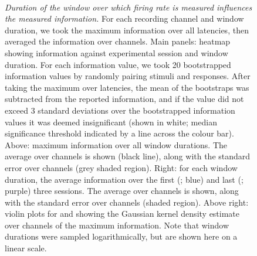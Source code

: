 \begin{figure}[htbp]%
    \centering
    \hspace*{\fill}
    \hspace*{\fill}\hspace{.2cm}\hspace*{\fill}
    \hspace*{\fill}
    \\
    \hspace*{\fill}
    \hspace*{\fill}\hspace{.2cm}\hspace*{\fill}
    \hspace*{\fill}
    \caption{\textit{Duration of the window over which firing rate is measured influences the measured information.}
For each recording channel and window duration, we took the maximum information over all latencies, then averaged the information over channels.
Main panels: heatmap showing information against experimental session and window duration.
For each information value, we took \num{20} bootstrapped information values by randomly pairing stimuli and responses.
After taking the maximum over latencies, the mean of the bootstraps was subtracted from the reported information, and if the value did not exceed \num{3} standard deviations over the bootstrapped information values it was deemed insignificant (shown in white; median significance threshold indicated by a line across the colour bar).
Above: maximum information over all window durations.
The average over channels is shown (black line), along with the standard error over channels (grey shaded region).
Right: for each window duration, the average information over the first (; blue) and last (; purple) three sessions.
The average over channels is shown, along with the standard error over channels (shaded region).
Above right: violin plots for  and  showing the Gaussian kernel density estimate over channels of the maximum information.
Note that window durations were sampled logarithmically, but are shown here on a linear scale.
    \label{fig:info_winlen}
}
\end{figure}

